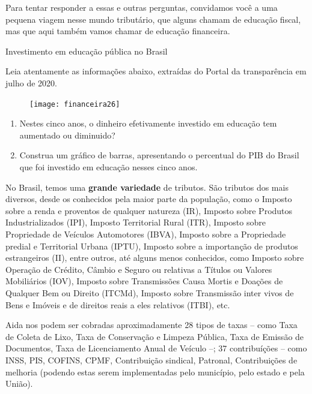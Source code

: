 Para tentar responder a essas e outras perguntas, convidamos você a uma pequena viagem nesse mundo tributário, que alguns chamam de educação fiscal, mas que aqui também vamos chamar de educação financeira.

\begin{task}{Investimento em educação pública no Brasil}
\label{fin-ativ-35}


Leia atentamente as informações abaixo, extraídas do Portal da transparência em julho de 2020.

\begin{figure}[H]
\centering

\texttt{[image: financeira26]}
\end{figure}

\begin{enumerate}
  \item Nestes cinco anos, o dinheiro efetivamente investido em educação tem aumentado ou diminuido?
  \item Construa um gráfico de barras, apresentando o percentual do PIB do Brasil que foi investido em educação nesses cinco anos.
\end{enumerate}

\end{task}

\begin{knowledge}
No Brasil, temos uma \textbf{grande variedade} de tributos. São tributos dos mais diversos, desde os conhecidos pela maior parte da população, como o Imposto sobre a renda e proventos de qualquer natureza (IR), Imposto sobre Produtos Industrializados (IPI), Imposto Territorial Rural (ITR), Imposto sobre Propriedade de Veículos Automotores (IBVA), Imposto sobre a Propriedade predial e Territorial Urbana (IPTU), Imposto sobre a importanção de produtos estrangeiros (II), entre outros, até alguns menos conhecidos, como Imposto sobre Operação de Crédito, Câmbio e Seguro ou relativas a Títulos ou Valores Mobiliários (IOV), Imposto sobre Transmissões Causa Mortis e Doações de Qualquer Bem ou Direito (ITCMd), Imposto sobre Transmissão inter vivos de Bens e Imóveis e de direitos reais a eles relativos (ITBI), etc.

Aida nos podem ser cobradas aproximadamente 28 tipos de taxas -- como Taxa de Coleta de Lixo, Taxa de Conservação e Limpeza Pública, Taxa de Emissão de Documentos, Taxa de Licenciamento Anual de Veículo --; 37 contribuíções -- como INSS, PIS, COFINS, CPMF, Contribuição sindical, Patronal, Contribuições de melhoria (podendo estas serem implementadas pelo município, pelo estado e pela União).
\end{knowledge}

